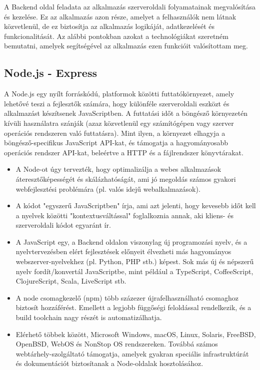 A Backend oldal feladata az alkalmazás szerveroldali folyamatainak megvalósítása és kezelése. Ez az alkalmazás azon része, amelyet a felhasználók nem látnak közvetlenül, de ez biztosítja az alkalmazás logikáját, adatkezelését és funkcionalitását. Az alábbi pontokban azokat a technológiákat szeretném bemutatni, amelyek segítségével az alkalmazás ezen funkcióit valósítottam meg.
\subsection{Node.js - Express}
A Node.js \cite{NodeJs} egy nyílt forráskódú, platformok közötti futtatókörnyezet, amely lehetővé teszi a fejlesztők számára, hogy különféle szerveroldali eszközt és alkalmazást készítsenek JavaScriptben. A futtatási időt a böngésző környezetén kívüli használatra szánják (azaz közvetlenül egy számítógépen vagy szerver operációs rendszeren való futtatásra). Mint ilyen, a környezet elhagyja a böngésző-specifikus JavaScript API-kat, és támogatja a hagyományosabb operációs rendszer API-kat, beleértve a HTTP és a fájlrendszer könyvtárakat.
 
\begin{itemize}
\item A Node-ot úgy tervezték, hogy optimalizálja a webes alkalmazások áteresztőképességét és skálázhatóságát, ami jó megoldás számos gyakori webfejlesztési problémára (pl. valós idejű webalkalmazások).
\item A kódot "egyszerű JavaScriptben" írja, ami azt jelenti, hogy kevesebb időt kell a nyelvek közötti "kontextusváltással" foglalkoznia annak, aki kliens- és szerveroldali kódot egyaránt ír.
\item A JavaScript egy, a Backend oldalon viszonylag új programozási nyelv, és a nyelvtervezésben elért fejlesztések előnyeit élvezheti más hagyományos webszerver-nyelvekhez (pl. Python, PHP stb.) képest. Sok más új és népszerű nyelv fordít/konvertál JavaScriptbe, mint például a TypeScript, CoffeeScript, ClojureScript, Scala, LiveScript stb.
\item  A node csomagkezelő (npm) több százezer újrafelhasználható csomaghoz biztosít hozzáférést. Emellett a legjobb függőségi feloldással rendelkezik, és a build toolchain nagy részét is automatizálhatja.
\item Elérhető többek között, Microsoft Windows, macOS, Linux, Solaris, FreeBSD, OpenBSD, WebOS és NonStop OS rendszereken. Továbbá számos webtárhely-szolgáltató támogatja, amelyek gyakran speciális infrastruktúrát és dokumentációt biztosítanak a Node-oldalak hosztolásához.
\end{itemize}

